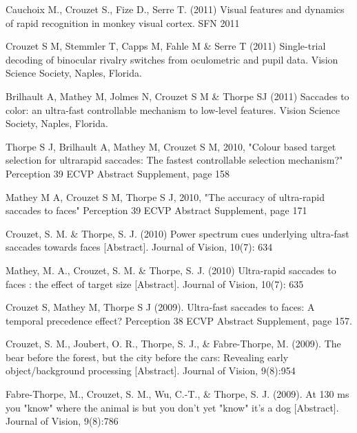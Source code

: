 \documentclass[margin,line]{resume}
\begin{document}
\begin{resume}
	\vspace{-2mm} Cauchoix M., Crouzet S., Fize D., Serre T. (2011) Visual features and dynamics of rapid recognition in monkey visual cortex. SFN 2011

\newpage

	\vspace{-2mm} Crouzet S M, Stemmler T, Capps M, Fahle M \& Serre T (2011) Single-trial decoding of binocular rivalry switches from oculometric and pupil data. Vision Science Society, Naples, Florida.

	\vspace{-2mm} Brilhault A, Mathey M, Jolmes N, Crouzet S M \& Thorpe SJ (2011) Saccades to color: an ultra-fast controllable mechanism to low-level features. Vision Science Society, Naples, Florida.

	\vspace{-2mm} Thorpe S J, Brilhault A, Mathey M, Crouzet S M, 2010, "Colour based target selection for ultrarapid saccades: The fastest controllable selection mechanism?" Perception 39 ECVP Abstract Supplement, page 158

	\vspace{-2mm} Mathey M A, Crouzet S M, Thorpe S J, 2010, "The accuracy of ultra-rapid saccades to faces" Perception 39 ECVP Abstract Supplement, page 171

	\vspace{-2mm} Crouzet, S. M. \& Thorpe, S. J. (2010) Power spectrum cues underlying ultra-fast saccades towards faces [Abstract]. Journal of Vision, 10(7): 634

	\vspace{-2mm} Mathey, M. A., Crouzet, S. M. \& Thorpe, S. J. (2010) Ultra-rapid saccades to faces : the effect of target size [Abstract]. Journal of Vision, 10(7): 635

	\vspace{-2mm} Crouzet S, Mathey M, Thorpe S J (2009). Ultra-fast saccades to faces: A temporal precedence effect? Perception 38 ECVP Abstract Supplement, page 157.

	\vspace{-2mm} Crouzet, S. M., Joubert, O. R., Thorpe, S. J., \& Fabre-Thorpe, M. (2009). The bear before the forest, but the city before the cars: Revealing early object/background processing [Abstract]. Journal of Vision, 9(8):954

	\vspace{-2mm} Fabre-Thorpe, M., Crouzet, S. M., Wu, C.-T., \& Thorpe, S. J. (2009). At 130 ms you "know" where the animal is but you don't yet "know" it's a dog [Abstract]. Journal of Vision, 9(8):786


\end{resume}
\end{document}
